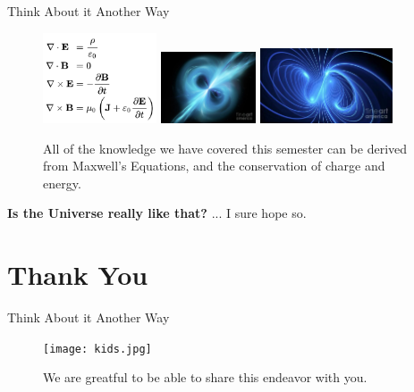 \documentclass{beamer}
\begin{document}
\begin{frame}{Think About it Another Way}
\begin{figure}
\centering
\includegraphics[width=0.3\textwidth]{max.png}
\includegraphics[width=0.25\textwidth]{field1.jpg}
\includegraphics[width=0.35\textwidth]{field2.jpg}
\caption{\label{fig:1} All of the knowledge we have covered this semester can be derived from Maxwell's Equations, and the conservation of charge and energy.}
\end{figure}
\textbf{Is the Universe really like that?} ... I sure hope so.
\end{frame}

\section{Thank You}

\begin{frame}{Think About it Another Way}
\begin{figure}
\centering
\texttt{[image: kids.jpg]}
\caption{\label{fig:2} We are greatful to be able to share this endeavor with you.}
\end{figure}
\end{frame}
\end{document}
